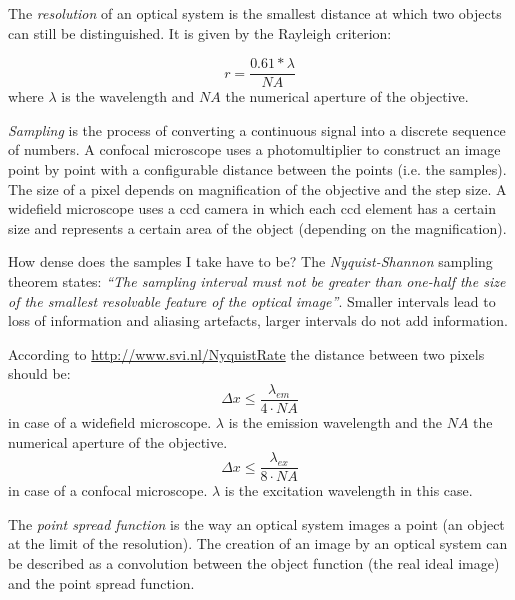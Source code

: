The \textit{resolution} of an optical system is the smallest distance at which two objects can still be distinguished. It is given by the Rayleigh criterion:

\begin{equation}
r=\frac{0.61*\lambda} {\textit{NA}}
\end{equation}
where $\lambda$ is the wavelength and $\textit{NA}$ the numerical aperture of the objective.

\textit{Sampling} is the process of converting a continuous signal into a discrete sequence of numbers. A confocal microscope uses a photomultiplier to construct an image point by point with a configurable distance between the points (i.e. the samples). The size of a pixel depends on magnification of the objective and the step size. A widefield microscope uses a ccd camera in which each ccd element has a certain size and represents a certain area of the object (depending on the magnification).

How dense does the samples I take have to be? The \textit{Nyquist-Shannon} sampling theorem states: \textit{``The sampling interval must not be greater than one-half the size of the smallest resolvable feature of the optical image''}. Smaller intervals lead to loss of information and aliasing artefacts, larger intervals do not add information.

According to \url{http://www.svi.nl/NyquistRate} the distance between two pixels should be:
\begin{equation}
\Delta x \leq \frac{\lambda_{em}} {4 \cdot \textit{NA}}
\end{equation}
in case of a widefield microscope. $\lambda$ is the emission wavelength and the $\textit{NA}$ the numerical aperture of the objective.
\begin{equation}
\Delta x \leq \frac{\lambda_{ex}} {8 \cdot \textit{NA}}
\end{equation}
in case of a confocal microscope. $\lambda$ is the excitation wavelength in this case.

The \textit{point spread function} is the way an optical system images a point (an object at the limit of the resolution). The creation of an image by an optical system can be described as a convolution between the object function (the real ideal image) and the point spread function.

